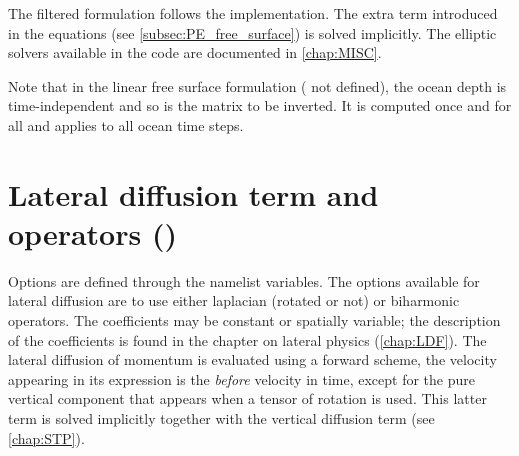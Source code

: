 \documentclass[../main/NEMO_manual]{subfiles}
\begin{document}
The filtered formulation follows the \citet{Roullet_Madec_JGR00} implementation. 
The extra term introduced in the equations (see \autoref{subsec:PE_free_surface}) is solved implicitly. 
The elliptic solvers available in the code are documented in \autoref{chap:MISC}.


Note that in the linear free surface formulation ( not defined),
the ocean depth is time-independent and so is the matrix to be inverted.
It is computed once and for all and applies to all ocean time steps. 

\section{Lateral diffusion term and operators (\protect{})}
\label{sec:DYN_ldf}


Options are defined through the  namelist variables.
The options available for lateral diffusion are to use either laplacian (rotated or not) or biharmonic operators.
The coefficients may be constant or spatially variable;
the description of the coefficients is found in the chapter on lateral physics (\autoref{chap:LDF}).
The lateral diffusion of momentum is evaluated using a forward scheme,
\ie the velocity appearing in its expression is the \textit{before} velocity in time,
except for the pure vertical component that appears when a tensor of rotation is used.
This latter term is solved implicitly together with the vertical diffusion term (see \autoref{chap:STP}).
\end{document}
